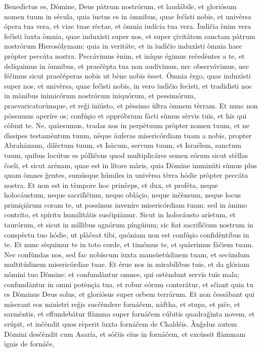 Benedìctus es, Dòmine, Deus pàtrum nostrórum, et laudábile, et gloriósum nomen tuum in sécula,
quia ïustus es in òmnibus, quae fečìsti nobīs, et univèrsa ópera tua vera, et viae tuae rèctae, et òmnia iudícia tua vera.
Ïudìčia ènim vera fečìsti ïuxta òmnia, quae induxìsti super nos, et super çivitátem sanctam pàtrum nostrórum Hierosòlymam: quia in veritáte, et in ïudìčio induxìsti òmnia haec pròpter peccáta nostra.
Peccávimus ènim, et iníque égimus rečedèntes a te, et delíquimus in òmnibus,
et praečèpta tua non audívimus, nec observávimus, nec féčimus sicut praečéperas nobīs ut bène nobīs èsset.
Òmnia èrgo, quae induxìsti super nos, et univèrsa, quae fečìsti nobīs, in vero ïudìčio fecìsti,
et tradidìsti nos in mànibus inimicórum nostrórum iniquórum, et pessimórum, praevaricatorùmque, et reǧi inïústo, et pèssimo ùltra òmnem tèrram.
Et nunc non pòssumus aperíre os; confúşio et oppróbrium fàcti sùmus sèrvīs tuīs, et hīs qui còlunt te.
Ne, quáesumus, tradas nos in perpètuum pròpter nomen tuum, et ne dìssipes testamèntum tuum,
nèque áuferas misericórdiam tuam a nobīs, propter Abrahámum, dilèctum tuum, et Isàcum, servum tuum, et Israélem, sanctum tuum,
quibus locútus es pòlličens quod multiplicáres semen eórum sicut stèllas čoeli, et sicut arénam, quae est in lítore màris,
quia Dòmine imminúti sùmus plus quam òmnes ǧentes, sumúsque húmiles in univèrsa tèrra hódie pròpter peccáta nostra.
Et non est in tèmpore hoc prinčeps, et dux, et proféta, neque holocáustum, neque sacrifìčium, neque obláçio, neque inčènsum, neque locus primiçiárum coram te,
ut possímus inveníre misericórdiam tuam: sed in ànimo contríto, et spíritu humilitátis susčipiámur.
Sicut in holocáusto aríetum, et taurórum, et sicut in mìllibus agnórum píngüium; sic fiat sacrifìčium nostrum in conspèctu tuo hódie, ut plàčeat tìbi, quóniam non est confúşio confidèntibus in te.
Et nunc sèquimur te in toto corde, et timémus te, et quáerimus fàčiem tuam.
Nec confùndas nos, sed fac nobíscum ïuxta mansüetúdinem tuam, et secùndum multitúdinem misericórdiae tuae.
Et érue nos in mirabílibus tuis, et da glóriam nómini tuo Dòmine:
et confundàntur omnes, qui ostèndunt servīs tuīs mala; confundàntur in omni potènçia tua, et robur eórum conterátur,
et sčiant quia tu es Dòminus Deus solus, et gloriósus super orbem terrárum.
Et non čessábant qui míserant eos minìstri reǧis sucčèndere fornáčem, nàftha, et stupa, et piče, et sarmèntīs,
et effundebátur flàmma super fornáčem cúbitīs quadraǧìnta novem,
et erúpit, et inčèndit quos rèperit ïuxta fornáčem de Chaldéīs.
Ànǧelus autem Dòmini desčèndit cum Asaría, et sóčiīs eïus in fornáčem, et excùssit flàmmam ìgnis de fornáče,
